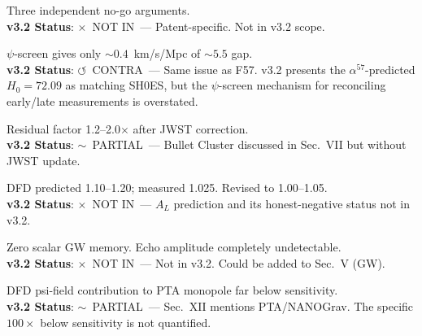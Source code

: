 \documentclass[11pt,a4paper]{article}
\newcommand{\vpartial}{\textcolor{statusPARTIAL}{$\sim$~PARTIAL}}
\newcommand{\vnot}{\textcolor{statusNOT}{$\times$~NOT IN}}
\newcommand{\vcontra}{\textcolor{statusCONTRA}{$\circlearrowleft$~CONTRA}}
\begin{document}
\begin{tcolorbox}[colback=negative!5,colframe=negative,title=\textbf{F70: P4 DEAD --- No Distance-Independent WPT}]
Three independent no-go arguments.\\
\textbf{v3.2 Status}: \vnot\ --- Patent-specific. Not in v3.2 scope.
\end{tcolorbox}

\begin{tcolorbox}[colback=negative!5,colframe=negative,title=\textbf{F71: H$_0$ Tension --- DFD Cannot Fully Explain}]
$\psi$-screen gives only $\sim 0.4$~km/s/Mpc of $\sim 5.5$ gap.\\
\textbf{v3.2 Status}: \vcontra\ --- Same issue as F57. v3.2 presents the $\alpha^{57}$-predicted $H_0 = 72.09$ as matching SH0ES, but the $\psi$-screen mechanism for reconciling early/late measurements is overstated.
\end{tcolorbox}

\begin{tcolorbox}[colback=negative!5,colframe=negative,title=\textbf{F72: Bullet Cluster Sub-Cluster Mass Deficit}]
Residual factor 1.2--2.0$\times$ after JWST correction.\\
\textbf{v3.2 Status}: \vpartial\ --- Bullet Cluster discussed in Sec.~VII but without JWST update.
\end{tcolorbox}

\begin{tcolorbox}[colback=negative!5,colframe=negative,title=\textbf{F73: $A_L$ Prediction Revised Down to Honest Negative}]
DFD predicted 1.10--1.20; measured 1.025. Revised to 1.00--1.05.\\
\textbf{v3.2 Status}: \vnot\ --- $A_L$ prediction and its honest-negative status not in v3.2.
\end{tcolorbox}

\begin{tcolorbox}[colback=negative!5,colframe=negative,title=\textbf{F74: GW Echoes Undetectable ($\sim 10^{-41}$ Amplitude)}]
Zero scalar GW memory. Echo amplitude completely undetectable.\\
\textbf{v3.2 Status}: \vnot\ --- Not in v3.2. Could be added to Sec.~V (GW).
\end{tcolorbox}

\begin{tcolorbox}[colback=negative!5,colframe=negative,title=\textbf{F75: PTA Monopole 100$\times$ Below NANOGrav}]
DFD psi-field contribution to PTA monopole far below sensitivity.\\
\textbf{v3.2 Status}: \vpartial\ --- Sec.~XII mentions PTA/NANOGrav. The specific $100\times$ below sensitivity is not quantified.
\end{tcolorbox}
\end{document}

